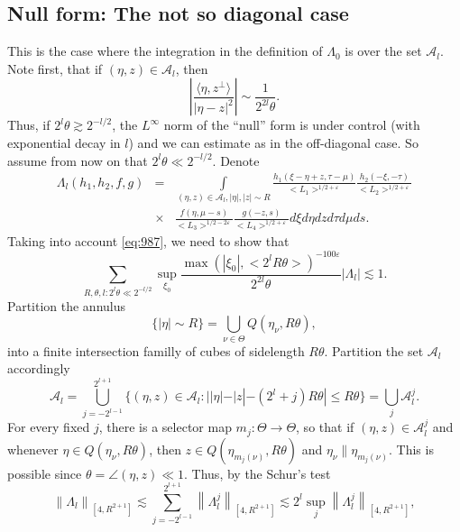 \documentclass[draft,11pt,leqno]{amsart}
\newcommand{\norm}[2]{{\left\| #1 \right\|}_{#2}}
\newcommand{\ve}{\varepsilon}
\newcommand{\Th}{\Theta}
\newcommand{\La}{\Lambda}
\newcommand{\ca}{\mathcal A}
\newcommand{\intl}{\int\limits}
\newcommand{\suml}{\sum\limits}
\newcommand{\supl}{\sup\limits}
\newcommand{\f}{\displaystyle\frac}
\newcommand{\dpr}[2]{\langle #1, #2\rangle}
\begin{document}
\vspace{.5cm}

\subsection{Null form: The not so diagonal case}

\vspace{.5cm}

This is the case where the integration in the definition of $\La_0$ is over the set $\ca_l$. Note first,
that if $(\eta,z)\in \ca_l$, then 
\begin{equation}
\label{eq:987}
\left|\f{\dpr{\eta}{z^{\bot}}}{|\eta-z|^2}\right|\sim \f{1}{2^{2l}\theta}.
\end{equation}
Thus, if $2^l\theta\gtrsim 2^{-l/2}$, the $L^\infty$ norm of the ``null'' form is under control 
(with exponential decay in 
$l$) and we can  estimate as in the off-diagonal case. 
So assume from now on that $2^l\theta\ll 2^{-l/2}$. Denote 
\begin{eqnarray*}
\La_l(h_1,h_2,f,g) &=&
\intl_{(\eta,z)\in \ca_l, |\eta|,|z| \sim R}
\f{h_1(\xi-\eta+z,\tau-\mu)}{<L_1>^
{1/2+\ve}} \f{h_2(-\xi,-\tau)}{<L_2>^{1/2+\ve}}  \\
&\times& \f{f(\eta,\mu-s)}{<L_3>^{1/2-2\ve}}
\f{g(-z,s)}{<L_4>^{1/2+\ve}}
d\xi d\eta dz d\tau d\mu ds.
\end{eqnarray*}
Taking into account \eqref{eq:987},  we need to show that 
\begin{equation}
\label{eq:988}
\suml_{R, \theta, l:2^l\theta\ll2^{-l/2}} \supl_{\xi_0}\f{\max(|\xi_0|, <2^lR\theta>)^{-100\ve}}{2^{2l}\theta}|\La_l|\lesssim 1. 
\end{equation}
Partition  the annulus 
$$
\{|\eta|\sim R\}=\bigcup\limits_{\nu\in\Th} Q(\eta_\nu, R\theta),
$$
into a finite intersection familly of cubes of sidelength $R\theta$. 
Partition the set $\ca_l$ accordingly
$$
\ca_l=\bigcup\limits_{j=-2^{l-1}}^{2^{l+1}} \{(\eta,z)\in \ca_l: ||\eta|-|z|-(2^l+j)R\theta|\leq R\theta\}=
\bigcup\limits_{j} \ca_l^j.
$$
For every fixed $j$, there is a selector map $m_j:\Th\to \Th$, so that if $(\eta,z)\in \ca_l^j$ and
whenever $\eta\in Q(\eta_\nu, R\theta)$, then $z\in Q(\eta_{m_j(\nu)}, R\theta)$ and $\eta_\nu\| \eta_{m_j(\nu)}$. 
This is possible since $\theta=\angle(\eta,z)\ll 1$. Thus, by the Schur's
 test
\begin{equation}
\label{eq:999}
\norm{\La_l}{[4,R^{2+1}]}\lesssim \suml_{j=-2^{l-1}}^{2^{l+1}}\norm{\La_l^j}{[4,R^{2+1}]}
\lesssim 2^l\supl_{j} \norm{\La_l^j}{[4,R^{2+1}]},
\end{equation}
\end{document}
